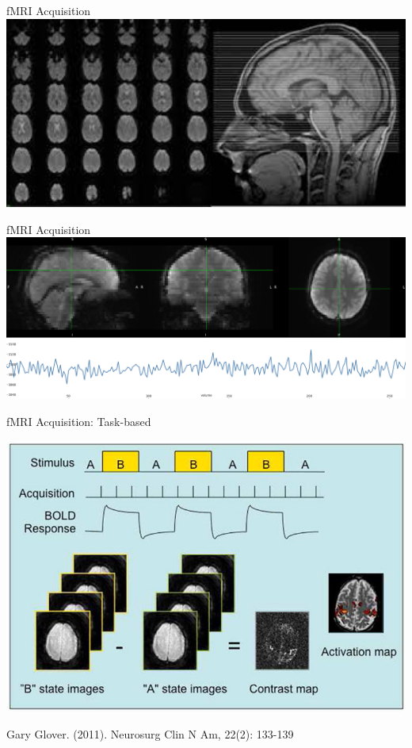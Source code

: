 \documentclass[aspectratio=169,xcolor=dvipsnames]{beamer}
\begin{document}
\begin{frame}{fMRI Acquisition}
\includegraphics[width=1\textwidth]{imgs/fmrislices}
\end{frame}


\begin{frame}{fMRI Acquisition}
\includegraphics[width=1\textwidth]{imgs/fmritimeseries}
\end{frame}


\begin{frame}{fMRI Acquisition: Task-based}

\includegraphics[width=.7\textwidth]{imgs/taskfmri}

\tiny{Gary Glover. (2011). Neurosurg Clin N Am, 22(2): 133-139}
\end{frame}
\end{document}
